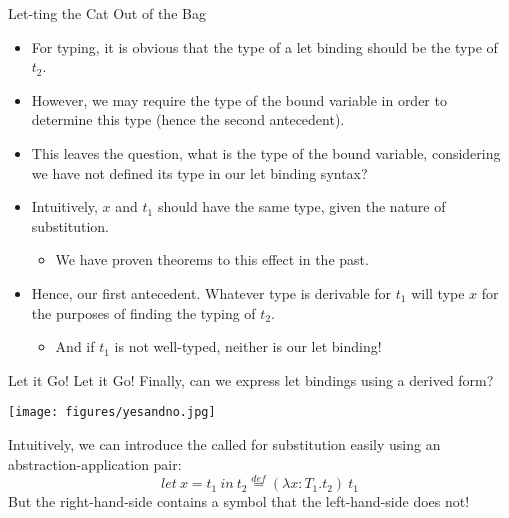 \documentclass[11pt]{beamer}
\begin{document}
\begin{frame}[fragile=singleslide]{Let-ting the Cat Out of the Bag}
\begin{itemize}
\item For typing, it is obvious that the type of a let binding should be the type of $t_2$.
\item However, we may require the type of the bound variable in order to determine this type (hence the second antecedent).
\item This leaves the question, what is the type of the bound variable, considering we have not defined its type in our let binding syntax? 
\item Intuitively, $x$ and $t_1$ should have the same type, given the nature of substitution.
\begin{itemize}
\item We have proven theorems to this effect in the past.
\end{itemize}
\item Hence, our first antecedent.  Whatever type is derivable for $t_1$ will type $x$ for the purposes of finding the typing of $t_2$.
\begin{itemize}
\item And if $t_1$ is not well-typed, neither is our let binding! 
\end{itemize}
\end{itemize}
\end{frame}


\begin{frame}[fragile=singleslide]{Let it Go! Let it Go!}
Finally, can we express let bindings using a derived form?
\begin{center}
\texttt{[image: figures/yesandno.jpg]}
\end{center}
Intuitively, we can introduce the called for substitution easily using an abstraction-application pair:
\begin{equation}
let\:x=t_1\:in\:t_2 \stackrel{def}{=} (\lambda x : T_1. t_2)\:t_1
\end{equation}
But the right-hand-side contains a symbol that the left-hand-side does not!
\end{frame}
\end{document}
